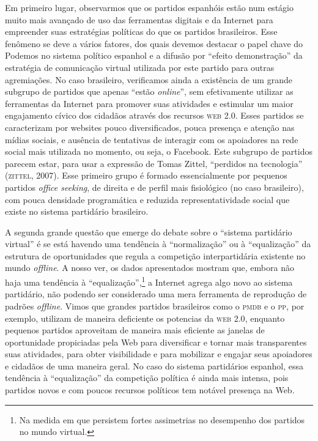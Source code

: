 Em primeiro lugar, observarmos que os partidos espanhóis estão num
estágio muito mais avançado de uso das ferramentas digitais e da
Internet para empreender suas estratégias políticas do que os partidos
brasileiros. Esse fenômeno se deve a vários fatores, dos quais devemos
destacar o papel chave do Podemos no sistema político espanhol e
a difusão por ``efeito demonstração'' da estratégia de comunicação
virtual utilizada por este partido para outras agremiações. No caso
brasileiro, verificamos ainda a existência de um grande subgrupo de
partidos que apenas ``estão \emph{online}'', sem efetivamente utilizar as
ferramentas da Internet para promover suas atividades e estimular um
maior engajamento cívico dos cidadãos através dos recursos \textsc{web 2.0}.
Esses partidos se caracterizam por websites pouco diversificados, pouca
presença e atenção nas mídias sociais, e ausência de tentativas de
interagir com os apoiadores na rede social mais utilizada no momento, ou
seja, o Facebook. Este subgrupo de partidos parecem estar, para usar a
expressão de Tomas Zittel, ``perdidos na tecnologia'' (\textsc{zittel}, 2007).
Esse primeiro grupo é formado essencialmente por pequenos partidos
\textit{office seeking}, de direita e de perfil mais fisiológico (no caso
brasileiro), com pouca densidade programática e reduzida
representatividade social que existe no sistema partidário brasileiro.

A segunda grande questão que emerge do debate sobre o ``sistema
partidário virtual'' é se está havendo uma tendência à ``normalização''
ou à ``equalização'' da estrutura de oportunidades que regula a
competição interpartidária existente no mundo \emph{offline}. A nosso ver, os
dados apresentados mostram que, embora não haja uma tendência à
``equalização'',\footnote{Na medida em que persistem fortes assimetrias no
desempenho dos partidos no mundo virtual.} a Internet agrega algo novo
ao sistema partidário, não podendo ser considerado uma mera ferramenta
de reprodução de padrões \emph{offline}. Vimos que grandes partidos
brasileiros como o \textsc{pmdb} e o \textsc{pp}, por exemplo, utilizam de maneira
deficiente os potencias da \textsc{web 2.0}, enquanto pequenos partidos
aproveitam de maneira mais eficiente as janelas de oportunidade
propiciadas pela Web para diversificar e tornar mais transparentes suas
atividades, para obter visibilidade e para mobilizar e engajar seus
apoiadores e cidadãos de uma maneira geral. No caso do sistema
partidários espanhol, essa tendência à ``equalização'' da competição
política é ainda mais intensa, pois partidos novos e com poucos recursos
políticos tem notável presença na Web.

